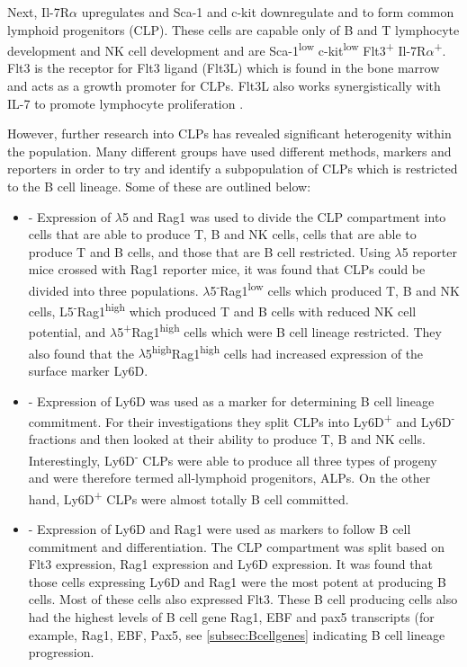 Next, Il-7R$\alpha$ upregulates and Sca-1 and c-kit downregulate and to form common lymphoid progenitors (CLP).
These cells are capable only of B and T lymphocyte development and NK cell development \citep{Kondo1997} and are Sca-1\textsuperscript{low} c-kit\textsuperscript{low} Flt3\textsuperscript{+} Il-7R$\alpha$\textsuperscript{+}.
Flt3 is the receptor for Flt3 ligand (Flt3L) which is found in the bone marrow and acts as a growth promoter for CLPs.
Flt3L also works synergistically with IL-7 to promote lymphocyte proliferation \citep{Holmes2006}.

However, further research into CLPs has revealed significant heterogenity within the population.
Many different groups have used different methods, markers and reporters in order to try and identify a subpopulation of CLPs which is restricted to the B cell lineage. 
Some of these are outlined below:
\begin{itemize}
\item \citet{Mansson2010} - Expression of $\lambda$5 and Rag1 was used to divide the CLP compartment into cells that are able to produce T, B and NK cells, cells that are able to produce T and B cells, and those that are B cell restricted.
Using $\lambda$5 reporter mice crossed with Rag1 reporter mice, it was found that CLPs could be divided into three populations.
$\lambda$5\textsuperscript{-}Rag1\textsuperscript{low} cells which produced T, B and NK cells, L5\textsuperscript{-}Rag1\textsuperscript{high} which produced T and B cells with reduced NK cell potential, and $\lambda$5\textsuperscript{+}Rag1\textsuperscript{high} cells which were B cell lineage restricted.
They also found that the $\lambda$5\textsuperscript{high}Rag1\textsuperscript{high} cells had increased expression of the surface marker Ly6D.
\item \citet{Inlay2009} - Expression of Ly6D was used as a marker for determining B cell lineage commitment.
For their investigations they split CLPs into Ly6D\textsuperscript{+} and Ly6D\textsuperscript{-} fractions and then looked at their ability to produce T, B and NK cells.
Interestingly, Ly6D\textsuperscript{-} CLPs were able to produce all three types of progeny and were therefore termed all-lymphoid progenitors, ALPs.
On the other hand, Ly6D\textsuperscript{+} CLPs were almost totally B cell committed.
\item \citet{Zhang2013} - Expression of Ly6D and Rag1 were used as markers to follow B cell commitment and differentiation.
The CLP compartment was split based on Flt3 expression, Rag1 expression and Ly6D expression.
It was found that those cells expressing Ly6D and Rag1 were the most potent at producing B cells. 
Most of these cells also expressed Flt3.
These B cell producing cells also had the highest levels of B cell gene Rag1, EBF and pax5 transcripts (for example, Rag1, EBF, Pax5, see \cref{subsec:Bcellgenes} indicating B cell lineage progression.
\end{itemize}

